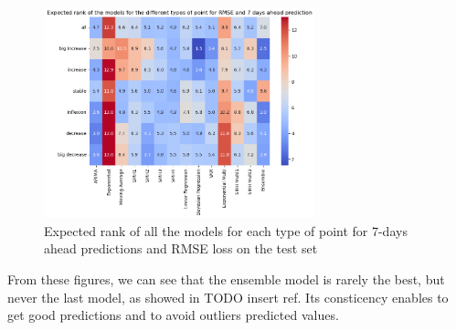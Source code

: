 \begin{figure}
    \centering
    \includegraphics[width=0.7\textwidth]{figures/heatmap_esb_7.png}
    \caption{Expected rank of all the models for each type of point for 7-days ahead predictions and RMSE loss on the test set}
    \label{fig:heatmap_esb_7}
\end{figure}

From these figures, we can see that the ensemble model is rarely the best, but never the last model, as showed in TODO insert ref.
Its consticency enables to get good predictions and to avoid outliers predicted values.





